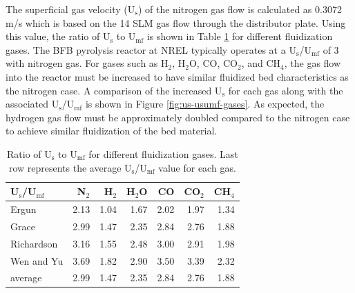 The superficial gas velocity (U$_\text{s}$) of the nitrogen gas flow is calculated as 0.3072 m/s which is based on the 14 SLM gas flow through the distributor plate. Using this value, the ratio of U$_\text{s}$ to U$_\text{mf}$ is shown in Table \ref{tab:us-umf-ratio} for different fluidization gases. The BFB pyrolysis reactor at NREL typically operates at a U$_\text{s}$/U$_\text{mf}$ of 3 with nitrogen gas. For gases such as H$_2$, H$_2$O, CO, CO$_2$, and CH$_4$, the gas flow into the reactor must be increased to have similar fluidized bed characteristics as the nitrogen case. A comparison of the increased U$_\text{s}$ for each gas along with the associated U$_\text{s}$/U$_\text{mf}$ is shown in Figure \ref{fig:us-usumf-gases}. As expected, the hydrogen gas flow must be approximately doubled compared to the nitrogen case to achieve similar fluidization of the bed material.

\begin{table}[H]
    \centering
    \caption{Ratio of U$_\text{s}$ to U$_\text{mf}$ for different fluidization gases. Last row represents the average U$_\text{s}$/U$_\text{mf}$ value for each gas.}
    \label{tab:us-umf-ratio}
    \begin{tabular}{lrrrrrr}
        \toprule
        U$_\text{s}$/U$_\text{mf}$ & N$_2$ & H$_2$ & H$_2$O & CO & CO$_2$ & CH$_4$ \\
        \midrule
        Ergun                      & 2.13 & 1.04 & 1.67 & 2.02 & 1.97 & 1.34 \\
        Grace                      & 2.99 & 1.47 & 2.35 & 2.84 & 2.76 & 1.88 \\
        Richardson                 & 3.16 & 1.55 & 2.48 & 3.00 & 2.91 & 1.98 \\
        Wen and Yu                 & 3.69 & 1.82 & 2.90 & 3.50 & 3.39 & 2.32 \\
        average                    & 2.99 & 1.47 & 2.35 & 2.84 & 2.76 & 1.88 \\
        \bottomrule
    \end{tabular}
\end{table}

